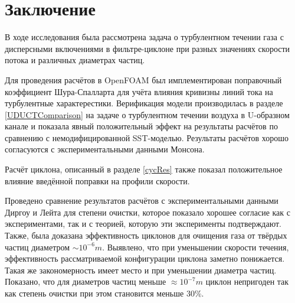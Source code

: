 \section*{Заключение}

В ходе исследования была рассмотрена задача о турбулентном течении газа с дисперсными включениями в фильтре-циклоне при разных значениях скорости потока и различных диаметрах частиц.

Для проведения расчётов в OpenFOAM был имплементирован поправочный коэффициент Шура-Спалларта для учёта влияния кривизны линий тока на турбулентные характерестики. Верификация модели производилась в разделе \ref{UDUCTComparison} на задаче о турбулентном течении воздуха в U-образном канале и показала явный положительный эффект на результаты расчётов по сравнению с немодифицированной SST-моделью. Результаты расчётов хорошо согласуются с экспериментальными данными Монсона.

Расчёт циклона, описанный в разделе \ref{cycRes} также показал положительное влияние введённой поправки на профили скорости. 

Проведено сравнение результатов расчётов с экспериментальными данными Диргоу и Лейта для степени очистки, которое показало хорошее согласие как с экспериментами, так и с теорией, которую эти эксперименты подтверждают.
Также, была доказана эффективность циклонов для очищения газа от твёрдых частиц диаметром $\sim 10^{-6}m$. Выявлено, что при уменьшении скорости течения, эффективность рассматриваемой конфигурации циклона заметно понижается. Такая же закономерность имеет место и при уменьшении диаметра частиц. Показано, что для диаметров частиц меньше $\approx 10^{-7}m$ циклон непригоден так как степень очистки при этом становится меньше 30\%.